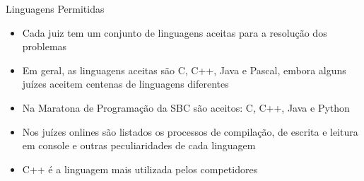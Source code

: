 \begin{frame}[fragile]{Linguagens Permitidas}

    \begin{itemize}
        \item  Cada  juiz tem um conjunto de linguagens aceitas para a resolução dos problemas
        \item Em geral, as linguagens aceitas são C, C++, Java e Pascal, embora alguns juízes aceitem centenas de linguagens diferentes
        \item Na Maratona de Programação da SBC são aceitos: C, C++, Java e Python
        \item Nos juízes onlines são listados os processos de compilação, de escrita e leitura em 
        console e outras peculiaridades de cada linguagem
        \item C++ é a linguagem mais utilizada pelos competidores
    \end{itemize}

\end{frame}
